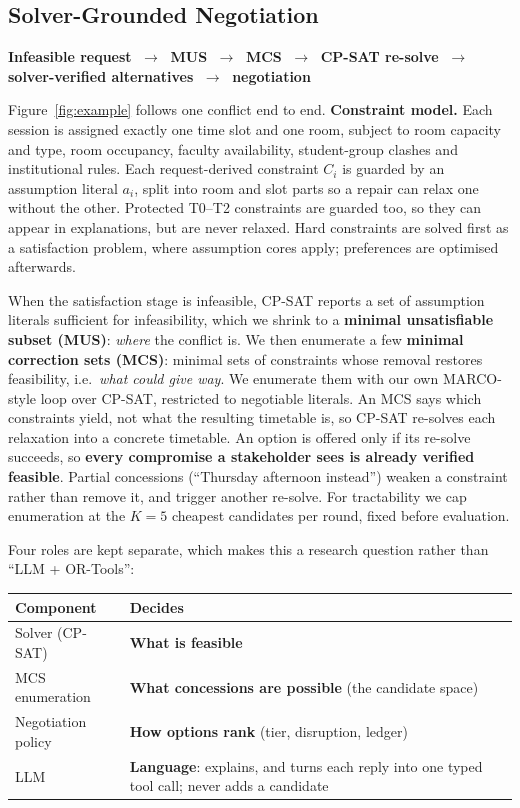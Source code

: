 \documentclass[11pt,a4paper]{article}
\begin{document}
\subsection{Solver-Grounded Negotiation}
\begin{keybox}
\centering
\textbf{Infeasible request} $\;\to\;$ \textbf{MUS} $\;\to\;$ \textbf{MCS}
$\;\to\;$ \textbf{CP-SAT re-solve} $\;\to\;$ \textbf{solver-verified
alternatives} $\;\to\;$ \textbf{negotiation}
\end{keybox}
\noindent Figure~\ref{fig:example} follows one conflict end to end.
\textbf{Constraint model.} Each session is assigned exactly one time slot
and one room, subject to room capacity and type, room occupancy, faculty
availability, student-group clashes and institutional rules. Each
request-derived constraint $C_i$ is guarded by an assumption literal $a_i$,
split into room and slot parts so a repair can relax one without the
other. Protected T0--T2 constraints are guarded too, so they can appear in
explanations, but are never relaxed. Hard constraints are solved first as a
satisfaction problem, where assumption cores apply; preferences are
optimised afterwards.

When the satisfaction stage is infeasible, CP-SAT reports a set of assumption literals
sufficient for infeasibility, which we shrink to a \textbf{minimal
unsatisfiable subset (MUS)}: \emph{where} the conflict is. We then enumerate
a few \textbf{minimal correction sets (MCS)}: minimal sets of constraints
whose removal restores feasibility, i.e.\ \emph{what could give way}.
We enumerate them with our own MARCO-style loop over CP-SAT,
restricted to negotiable literals. An MCS
says which constraints yield, not what the resulting timetable is, so CP-SAT
re-solves each relaxation into a concrete timetable. An option is offered
only if its re-solve succeeds, so \textbf{every compromise a stakeholder
sees is already verified feasible}. Partial concessions (``Thursday afternoon
instead'') weaken a constraint rather than remove it, and trigger another
re-solve. For tractability we cap enumeration at the $K{=}5$ cheapest
candidates per round, fixed before evaluation.

\noindent Four roles are kept separate, which makes this a research question
rather than ``LLM + OR-Tools'':
\begin{table}[H]
\centering\small
\begin{tabularx}{\textwidth}{@{}L{3.6cm} Y@{}}
\toprule
\textbf{Component} & \textbf{Decides}\\
\midrule
Solver (CP-SAT) & \textbf{What is feasible}\\
MCS enumeration & \textbf{What concessions are possible} (the candidate space)\\
Negotiation policy & \textbf{How options rank} (tier, disruption, ledger)\\
LLM & \textbf{Language}: explains, and turns each reply into one typed tool call; never adds a candidate\\
\bottomrule
\end{tabularx}
\end{table}
\end{document}
